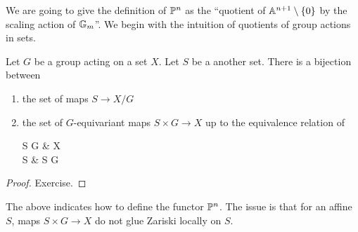 \documentclass[./main.tex]{subfiles}
\begin{document}
We are going to give the definition of
$\mathbb{P}^n$ as the ``quotient of $\mathbb{A}^{n+1}\setminus\left\{0\right\}$
by the scaling action of $\mathbb{G}_m$''.
We begin with the intuition of quotients of group actions
in sets.

\begin{prop}
  
  Let $G$ be a group acting on a set $X$.
  Let $S$ be a another set.
  There is a bijection between \begin{enumerate}
    \item the set of maps $S \to X / G$
    \item the set of $G$-equivariant maps $S \times G \to X$
    up to the equivalence relation of \begin{cd}
      {S \times G} & X \\
      S & {S \times G}
      \arrow[from=1-1, to=2-1]
      \arrow[from=2-1, to=2-2]
      \arrow["x", from=1-1, to=1-2]
      \arrow["y"', from=2-2, to=1-2]
      \arrow["{\exists \, g}"', from=1-1, to=2-2]
    \end{cd}
  \end{enumerate}
\end{prop}
\begin{proof}
  Exercise.
\end{proof}

The above indicates how to define the functor $\mathbb{P}^n$.
The issue is that for an affine $S$,
maps $S \times G \to X$ do not glue Zariski locally on $S$.
\end{document}
